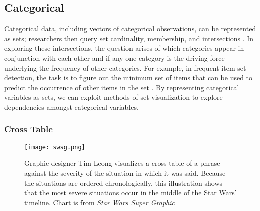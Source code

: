 \documentclass[../main.tex]{subfiles}
\begin{document}
\subsection{Categorical}
\label{sec:categorical}
Categorical data, including vectors of categorical observations, can be represented as sets; researchers then query set cardinality, membership, and intersections \cite{agresti_categorical_2011,schneider_set-theoretic_2012}. In exploring these intersections, the question arises of which categories appear in conjunction with each other and if any one category is the driving force underlying the frequency of other categories. For example, in frequent item set detection, the task is to figure out the minimum set of items that can be used to predict the occurrence of other items in the set \cite{leskovec_mining_2014,Srikant:1997:MAR:3001392.3001404}. By representing categorical variables as sets, we can exploit methods of set visualization to explore dependencies amongst categorical variables.

\subsubsection{Cross Table}
\label{sec:crosstab}
\begin{figure}[H]
\texttt{[image: swsg.png]}
\caption{Graphic designer Tim Leong visualizes a cross table of a phrase against the severity of the situation in which it was said. Because the situations are ordered chronologically, this illustration shows that the most severe situations occur in the middle of the Star Wars' timeline. Chart is from \textit{Star Wars Super Graphic} \cite{leong_star_2017}}
\label{fig:starwars}
\end{figure}
\end{document}
